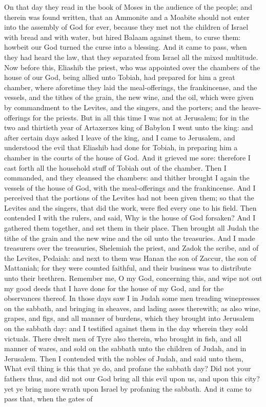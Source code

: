 On that day they read in the book of Moses in the audience of the people; and therein was found written, that an Ammonite and a Moabite should not enter into the assembly of God for ever, because they met not the children of Israel with bread and with water, but hired Balaam against them, to curse them: howbeit our God turned the curse into a blessing. And it came to pass, when they had heard the law, that they separated from Israel all the mixed multitude.  Now before this, Eliashib the priest, who was appointed over the chambers of the house of our God, being allied unto Tobiah, had prepared for him a great chamber, where aforetime they laid the meal-offerings, the frankincense, and the vessels, and the tithes of the grain, the new wine, and the oil, which were given by commandment to the Levites, and the singers, and the porters; and the heave-offerings for the priests. But in all this time I was not at Jerusalem; for in the two and thirtieth year of Artaxerxes king of Babylon I went unto the king: and after certain days asked I leave of the king, and I came to Jerusalem, and understood the evil that Eliashib had done for Tobiah, in preparing him a chamber in the courts of the house of God. And it grieved me sore: therefore I cast forth all the household stuff of Tobiah out of the chamber. Then I commanded, and they cleansed the chambers: and thither brought I again the vessels of the house of God, with the meal-offerings and the frankincense.  And I perceived that the portions of the Levites had not been given them; so that the Levites and the singers, that did the work, were fled every one to his field. Then contended I with the rulers, and said, Why is the house of God forsaken? And I gathered them together, and set them in their place. Then brought all Judah the tithe of the grain and the new wine and the oil unto the treasuries. And I made treasurers over the treasuries, Shelemiah the priest, and Zadok the scribe, and of the Levites, Pedaiah: and next to them was Hanan the son of Zaccur, the son of Mattaniah; for they were counted faithful, and their business was to distribute unto their brethren. Remember me, O my God, concerning this, and wipe not out my good deeds that I have done for the house of my God, and for the observances thereof.  In those days saw I in Judah some men treading winepresses on the sabbath, and bringing in sheaves, and lading asses therewith; as also wine, grapes, and figs, and all manner of burdens, which they brought into Jerusalem on the sabbath day: and I testified against them in the day wherein they sold victuals. There dwelt men of Tyre also therein, who brought in fish, and all manner of wares, and sold on the sabbath unto the children of Judah, and in Jerusalem. Then I contended with the nobles of Judah, and said unto them, What evil thing is this that ye do, and profane the sabbath day? Did not your fathers thus, and did not our God bring all this evil upon us, and upon this city? yet ye bring more wrath upon Israel by profaning the sabbath.  And it came to pass that, when the gates of 